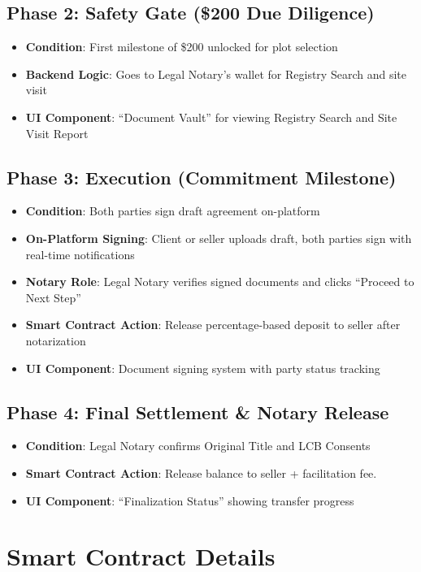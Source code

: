 \documentclass[12pt,a4paper]{article}
\begin{document}
\subsection{Phase 2: Safety Gate (\$200 Due Diligence)}
\begin{itemize}
\item \textbf{Condition}: First milestone of \$200 unlocked for plot selection
\item \textbf{Backend Logic}: Goes to Legal Notary's wallet for Registry Search and site visit
\item \textbf{UI Component}: ``Document Vault'' for viewing Registry Search and Site Visit Report
\end{itemize}

\subsection{Phase 3: Execution (Commitment Milestone)}
\begin{itemize}
\item \textbf{Condition}: Both parties sign draft agreement on-platform
\item \textbf{On-Platform Signing}: Client or seller uploads draft, both parties sign with real-time notifications
\item \textbf{Notary Role}: Legal Notary verifies signed documents and clicks ``Proceed to Next Step''
\item \textbf{Smart Contract Action}: Release percentage-based deposit to seller after notarization
\item \textbf{UI Component}: Document signing system with party status tracking
\end{itemize}

\subsection{Phase 4: Final Settlement \& Notary Release}
\begin{itemize}
\item \textbf{Condition}: Legal Notary confirms Original Title and LCB Consents
\item \textbf{Smart Contract Action}: Release balance to seller + facilitation fee.
\item \textbf{UI Component}: ``Finalization Status'' showing transfer progress
\end{itemize}

\section{Smart Contract Details}
\end{document}
